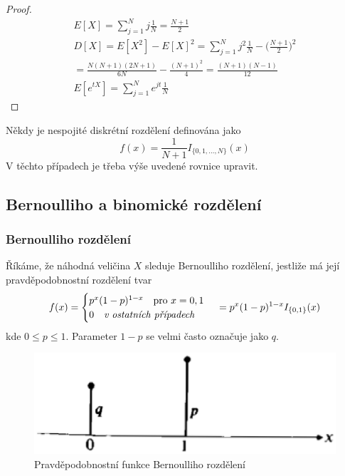 \begin{proof}
\begin{gather*}
E[X] = \sum_{j = 1}^N j \frac{1}{N} = \frac{N+1}{2}\\
D[X] = E[X^2] - E[X]^2 = \sum_{j=1}^N j^2 \frac{1}{N} - \Big( \frac{N+1}{2} \Big)^2\\
= \frac{N(N+1)(2N+1)}{6N} - \frac{(N+1)^2}{4} = \frac{(N+1)(N-1)}{12}\\
E[e^{tX}] = \sum_{j = 1}^N e^{jt} \frac{1}{N}
\end{gather*}
\end{proof}

Někdy je nespojité diskrétní rozdělení definována jako
\begin{equation*}
f(x) = \frac{1}{N+1}I_{\{0,1,...,N\}}(x)
\end{equation*}
V těchto případech je třeba výše uvedené rovnice upravit.

\subsection{Bernoulliho a binomické rozdělení}

\subsubsection{Bernoulliho rozdělení}

\begin{definition}
Říkáme, že náhodná veličina $X$ sleduje Bernoulliho rozdělení, jestliže má její pravděpodobnostní rozdělení tvar
\begin{equation*}
f(x) =
\begin{cases}
p^x(1-p)^{1-x}~~~\text{pro}~x = 0, 1\\
0~~~\textit{v ostatních případech}
\end{cases}\\
= p^x(1-p)^{1-x}I_{\{0,1\}}(x)
\end{equation*}
kde $0 \le p \le 1$. Parameter $1-p$ se velmi často označuje jako $q$.
\end{definition}

\begin{figure}[htp]
\centering
\includegraphics[scale = 0.5]{pictures/bernoulli_distribution.eps}
\caption{Pravděpodobnostní funkce Bernoulliho rozdělení}
\label{bernoulli_distribution}
\end{figure}  

